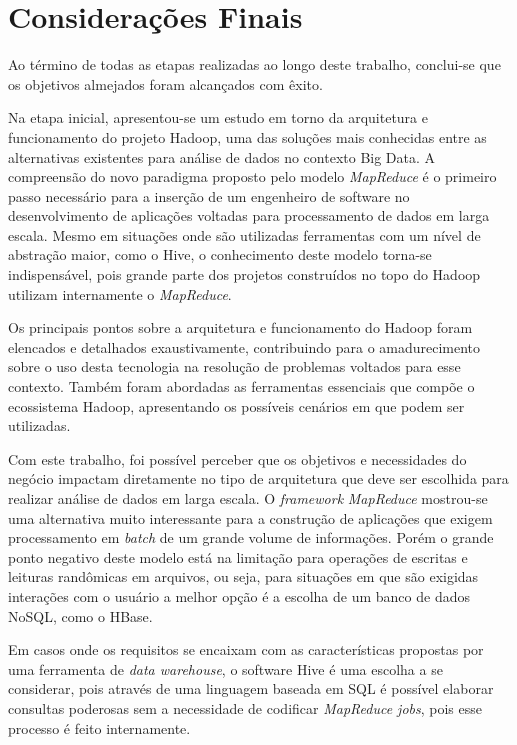 \chapter{Considerações Finais}
\label{cap:conclusao}

Ao término de todas as etapas realizadas ao longo deste trabalho, conclui-se que os objetivos almejados foram alcançados com êxito.

Na etapa inicial, apresentou-se um estudo em torno da arquitetura e funcionamento do projeto Hadoop, uma das soluções mais conhecidas entre as alternativas existentes para análise de dados no contexto Big Data. A compreensão do novo paradigma proposto pelo modelo \textit{MapReduce} é o primeiro passo necessário para a inserção de um engenheiro de software no desenvolvimento de aplicações voltadas para processamento de dados em larga escala. Mesmo em situações onde são utilizadas ferramentas com um nível de abstração maior, como o Hive, o conhecimento deste modelo torna-se indispensável, pois grande parte dos projetos construídos no topo do Hadoop utilizam internamente o \textit{MapReduce}.

Os principais pontos sobre a arquitetura e funcionamento do Hadoop foram elencados e detalhados exaustivamente, contribuindo para o amadurecimento sobre o uso desta tecnologia na resolução de problemas voltados para esse contexto. Também foram abordadas as ferramentas essenciais que compõe o ecossistema Hadoop, apresentando os possíveis cenários em que podem ser utilizadas.

Com este trabalho, foi possível perceber que os objetivos e necessidades do negócio impactam diretamente no tipo de arquitetura que deve ser escolhida para realizar análise de dados em larga escala. O \textit{framework} \textit{MapReduce} mostrou-se uma alternativa muito interessante para a construção de aplicações que exigem processamento em \textit{batch} de um grande volume de informações. Porém o grande ponto negativo deste modelo está na limitação para operações de escritas e leituras randômicas em arquivos, ou seja, para situações em que são exigidas interações com o usuário a melhor opção é a escolha de um banco de dados NoSQL, como o HBase.

Em casos onde os requisitos se encaixam com as características propostas por uma ferramenta de \textit{data warehouse}, o software Hive é uma escolha a se considerar, pois através de uma linguagem baseada em SQL é possível elaborar consultas poderosas sem a necessidade de codificar \textit{MapReduce jobs}, pois esse processo é feito internamente.

